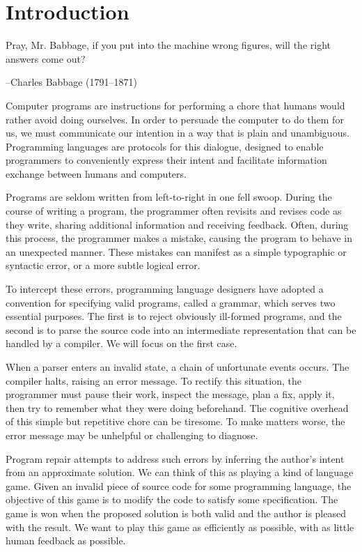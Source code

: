 \chapter{\rm\bfseries Introduction}
\label{ch:introduction}

\epigraph{Pray, Mr. Babbage, if you put into the machine wrong figures, will the right answers come out?}{--Charles Babbage (1791--1871)}


Computer programs are instructions for performing a chore that humans would rather avoid doing ourselves. In order to persuade the computer to do them for us, we must communicate our intention in a way that is plain and unambiguous. Programming languages are protocols for this dialogue, designed to enable programmers to conveniently express their intent and facilitate information exchange between humans and computers.

Programs are seldom written from left-to-right in one fell swoop. During the course of writing a program, the programmer often revisits and revises code as they write, sharing additional information and receiving feedback. Often, during this process, the programmer makes a mistake, causing the program to behave in an unexpected manner. These mistakes can manifest as a simple typographic or syntactic error, or a more subtle logical error.

To intercept these errors, programming language designers have adopted a convention for specifying valid programs, called a grammar, which serves two essential purposes. The first is to reject obviously ill-formed programs, and the second is to parse the source code into an intermediate representation that can be handled by a compiler. We will focus on the first case.

When a parser enters an invalid state, a chain of unfortunate events occurs. The compiler halts, raising an error message. To rectify this situation, the programmer must pause their work, inspect the message, plan a fix, apply it, then try to remember what they were doing beforehand. The cognitive overhead of this simple but repetitive chore can be tiresome. To make matters worse, the error message may be unhelpful or challenging to diagnose.

Program repair attempts to address such errors by inferring the author's intent from an approximate solution. We can think of this as playing a kind of language game. Given an invalid piece of source code for some programming language, the objective of this game is to modify the code to satisfy some specification. The game is won when the proposed solution is both valid and the author is pleased with the result. We want to play this game as efficiently as possible, with as little human feedback as possible.

